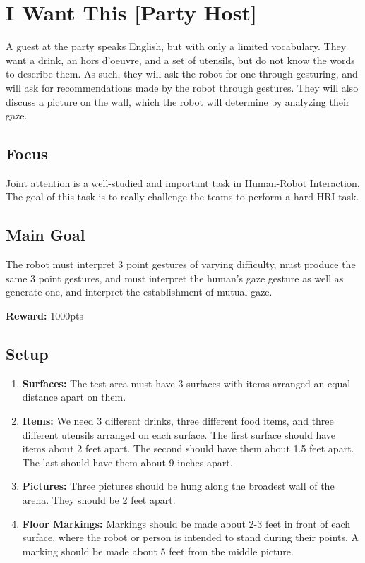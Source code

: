 \section{I Want This [Party Host]}
A guest at the party speaks English, but with only a limited vocabulary. They want a drink, an hors d'oeuvre, and a set of utensils, but do not know the words to describe them. As such, they will ask the robot for one through gesturing, and will ask for recommendations made by the robot through gestures. They will also discuss a picture on the wall, which the robot will determine by analyzing their gaze.

\subsection{Focus}
Joint attention is a well-studied and important task in Human-Robot Interaction. The goal of this task is to really challenge the teams to perform a hard HRI task.

\subsection{Main Goal}
The robot must interpret 3 point gestures of varying difficulty, must produce the same 3 point gestures, and must interpret the human's gaze gesture as well as generate one, and interpret the establishment of mutual gaze.

\noindent\textbf{Reward:} 1000pts\\


%
%
\subsection{Setup}
\begin{enumerate}
	\item \textbf{Surfaces:} The test area must have 3 surfaces with items arranged an equal distance apart on them.

	\item \textbf{Items:} We need 3 different drinks, three different food items, and three different utensils arranged on each surface. The first surface should have items about 2 feet apart. The second should have them about 1.5 feet apart. The last should have them about 9 inches apart.

	\item \textbf{Pictures:} Three pictures should be hung along the broadest wall of the arena. They should be 2 feet apart.

	\item \textbf{Floor Markings:} Markings should be made about 2-3 feet in front of each surface, where the robot or person is intended to stand during their points. A marking should be made about 5 feet from the middle picture.

\end{enumerate}



